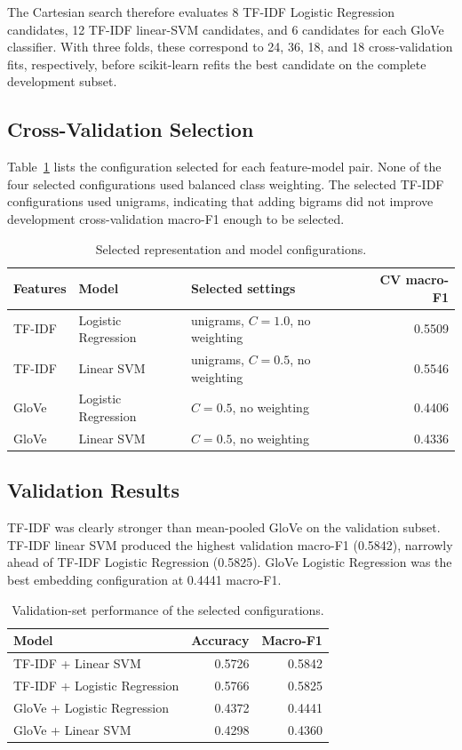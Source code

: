 The Cartesian search therefore evaluates 8 TF-IDF Logistic Regression candidates, 12 TF-IDF linear-SVM candidates, and 6 candidates for each GloVe classifier. With three folds, these correspond to 24, 36, 18, and 18 cross-validation fits, respectively, before scikit-learn refits the best candidate on the complete development subset.

\subsection{Cross-Validation Selection}

Table~\ref{tab:selected-settings} lists the configuration selected for each feature-model pair. None of the four selected configurations used balanced class weighting. The selected TF-IDF configurations used unigrams, indicating that adding bigrams did not improve development cross-validation macro-F1 enough to be selected.

\begin{table}[H]
\centering
\begin{tabularx}{\textwidth}{|l|l|X|r|}
\hline
Features & Model & Selected settings & CV macro-F1 \\
\hline
TF-IDF & Logistic Regression & unigrams, $C=1.0$, no weighting & 0.5509 \\
\hline
TF-IDF & Linear SVM & unigrams, $C=0.5$, no weighting & 0.5546 \\
\hline
GloVe & Logistic Regression & $C=0.5$, no weighting & 0.4406 \\
\hline
GloVe & Linear SVM & $C=0.5$, no weighting & 0.4336 \\
\hline
\end{tabularx}
\caption{Selected representation and model configurations.}
\label{tab:selected-settings}
\end{table}

\subsection{Validation Results}

TF-IDF was clearly stronger than mean-pooled GloVe on the validation subset. TF-IDF linear SVM produced the highest validation macro-F1 (0.5842), narrowly ahead of TF-IDF Logistic Regression (0.5825). GloVe Logistic Regression was the best embedding configuration at 0.4441 macro-F1.

\begin{table}[H]
\centering
\small
\begin{tabular}{|l|r|r|}
\hline
Model & Accuracy & Macro-F1 \\
\hline
TF-IDF + Linear SVM & 0.5726 & 0.5842 \\
\hline
TF-IDF + Logistic Regression & 0.5766 & 0.5825 \\
\hline
GloVe + Logistic Regression & 0.4372 & 0.4441 \\
\hline
GloVe + Linear SVM & 0.4298 & 0.4360 \\
\hline
\end{tabular}
\caption{Validation-set performance of the selected configurations.}
\label{tab:validation-results}
\end{table}
